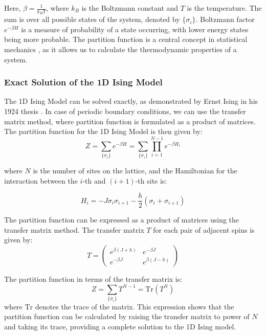 Here, $\beta = \frac{1}{k_B T}$, where $k_B$ is the Boltzmann constant and $T$
is the temperature. The sum is over all possible states of the system, denoted
by $\{\sigma_i\}$. Boltzmann factor $e^{-\beta H}$ is a measure of probability
of a state occurring, with lower energy states being more probable. The
partition function is a central concept in statistical mechanics
\cite{Kardar2013} \cite{Yoshioka2007}, as it allows us to calculate the
thermodynamic properties of a system.

\subsubsection{Exact Solution of the 1D Ising Model}
The 1D Ising Model can be solved exactly, as demonstrated by Ernst Ising in his
1924 thesis \cite{Ising1925}. In case of periodic boundary conditions, we can
use the transfer matrix method, where partition function is formulated as a
product of matrices. The partition function for the 1D Ising Model is then given
by:
\begin{equation}
  \label{eq:partition1d}
  Z = \sum_{\{\sigma_i\}} e^{-\beta H} = \sum_{\{\sigma_i\}} \prod_{i=1}^{N-1} e^{-\beta H_i}
\end{equation}

where \( N \) is the number of sites on the lattice, and the Hamiltonian for the
interaction between the \( i \)-th and \( (i+1) \)-th site is:

\begin{equation}
  \label{eq:hamiltonian1d}
  H_i = -J \sigma_i \sigma_{i+1} - \frac{h}{2} (\sigma_i + \sigma_{i+1})
\end{equation}

The partition function can be expressed as a product of matrices using the
transfer matrix method. The transfer matrix \( T \) for each pair of adjacent
spins is given by:
\begin{equation}
  \label{eq:transfer1d}
  T = \begin{pmatrix}
    e^{\beta(J+h)} & e^{-\beta J} \\
    e^{-\beta J} & e^{\beta(J-h)}
  \end{pmatrix}
\end{equation}

The partition function in terms of the transfer matrix is:
\begin{equation}
  \label{eq:partition1dmat2}
  Z = \sum_{\{\sigma_i\}} T^{N-1} = \text{Tr}(T^N)
\end{equation}
where \( \text{Tr} \) denotes the trace of the matrix. This expression shows
that the partition function can be calculated by raising the transfer matrix to
power of \( N \) and taking its trace, providing a complete solution to the 1D
Ising model.

